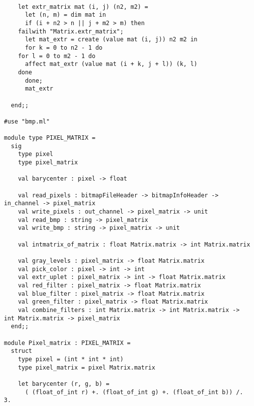 \documentclass[a4paper,10pt]{report}
\theoremstyle{break}
\begin{document}
    \begin{lstlisting}

    let extr_matrix mat (i, j) (n2, m2) =
      let (n, m) = dim mat in
      if (i + n2 > n || j + m2 > m) then
	failwith "Matrix.extr_matrix";
      let mat_extr = create (value mat (i, j)) n2 m2 in
      for k = 0 to n2 - 1 do
	for l = 0 to m2 - 1 do
	  affect mat_extr (value mat (i + k, j + l)) (k, l)
	done
      done;
      mat_extr

  end;;

#use "bmp.ml"

module type PIXEL_MATRIX =
  sig
    type pixel
    type pixel_matrix
	
    val barycenter : pixel -> float

    val read_pixels : bitmapFileHeader -> bitmapInfoHeader -> in_channel -> pixel_matrix
    val write_pixels : out_channel -> pixel_matrix -> unit
    val read_bmp : string -> pixel_matrix
    val write_bmp : string -> pixel_matrix -> unit

    val intmatrix_of_matrix : float Matrix.matrix -> int Matrix.matrix

    val gray_levels : pixel_matrix -> float Matrix.matrix
    val pick_color : pixel -> int -> int
    val extr_uplet : pixel_matrix -> int -> float Matrix.matrix
    val red_filter : pixel_matrix -> float Matrix.matrix
    val blue_filter : pixel_matrix -> float Matrix.matrix
    val green_filter : pixel_matrix -> float Matrix.matrix
    val combine_filters : int Matrix.matrix -> int Matrix.matrix -> int Matrix.matrix -> pixel_matrix
  end;;

module Pixel_matrix : PIXEL_MATRIX =
  struct
    type pixel = (int * int * int)
    type pixel_matrix = pixel Matrix.matrix

    let barycenter (r, g, b) =
      ( (float_of_int r) +. (float_of_int g) +. (float_of_int b)) /. 3.
	
    \end{lstlisting}
\newpage
\end{document}
